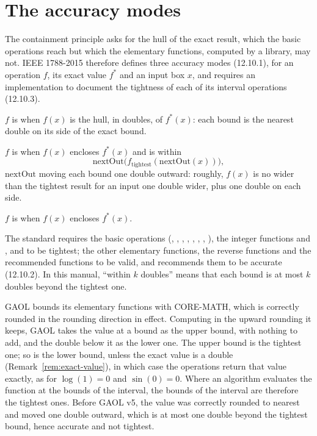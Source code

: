 \documentclass[12pt,a4paper,twoside,openright]{book}
\begin{document}
\section{The accuracy modes}\label{sec:accuracy-modes}
%
%

The containment principle asks for the hull of the exact result, which the
basic operations reach but which the elementary functions, computed by a
library, may not. IEEE 1788-2015 therefore defines three accuracy modes
(12.10.1), for an operation $f$, its exact value $f^*$ and an input box
$x$, and requires an implementation to document the tightness of each of
its interval operations (12.10.3).

\begin{Def}[Tightest]\label{def:tightest}
$f$ is  when $f(x)$ is the hull, in doubles, of $f^*(x)$:
each bound is the nearest double on its side of the exact bound.
\end{Def}

\begin{Def}[Accurate]\label{def:accurate}
$f$ is  when $f(x)$ encloses $f^*(x)$ and is within
\begin{equation*}
  \mathrm{nextOut}\bigl(f_{\mathrm{tightest}}(\mathrm{nextOut}(x))\bigr),
\end{equation*}
$\mathrm{nextOut}$ moving each bound one double outward: roughly, $f(x)$
is no wider than the tightest result for an input one double wider, plus
one double on each side.
\end{Def}

\begin{Def}[Valid]\label{def:valid}
$f$ is  when $f(x)$ encloses $f^*(x)$.
\end{Def}

The standard requires the basic operations (, ,
, , , , , ),
the integer functions and ,  and  to be
tightest; the other elementary functions, the reverse functions and the
recommended functions to be valid, and recommends them to be accurate
(12.10.2). In this manual, ``within $k$ doubles'' means that each bound is
at most $k$ doubles beyond the tightest one.

\medskip
GAOL bounds its elementary functions with CORE-MATH, which is correctly
rounded in the rounding direction in effect. Computing in the upward
rounding it keeps, GAOL takes the value at a bound as the upper bound, with
nothing to add, and the double below it as the lower one. The upper bound is
the tightest one; so is the lower bound, unless the exact value is a double
(Remark~\ref{rem:exact-value}), in which case the operations return that
value exactly, as for $\log(1)=0$ and $\sin(0)=0$. Where an algorithm
evaluates the function at the bounds of the interval, the bounds of the
interval are therefore the tightest ones. Before GAOL v5, the value was
correctly rounded to nearest and moved one double outward, which is at
most one double beyond the tightest bound, hence accurate and not
tightest.\newinvfive
\end{document}
